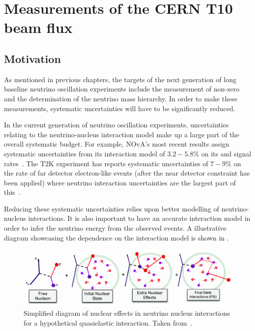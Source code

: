 \chapter{Measurements of the CERN T10 beam flux}
\label{sec:hptpc_beam_flux}

\section{Motivation}
\label{sec:hptpc_beam_flux:motivation}

As mentioned in previous chapters, the targets of the next generation of long baseline neutrino oscillation experiments include the measurement of non-zero \dcp and the determination of the neutrino mass hierarchy.
In order to make these measurements, systematic uncertainties will have to be significantly reduced.

In the current generation of neutrino oscillation experiments, uncertainties relating to the neutrino-nucleus interaction model make up a large part of the overall systematic budget.
For example, NOvA's most recent results assign systematic uncertainties from its interaction model of $3.2-5.8\%$ on its \nue and \anue signal rates~\cite{novaRecent}.
The T2K experiment has reports systematic uncertainties of $7-9\%$ on the rate of far detector electron-like events (after the near detector constraint has been applied) where neutrino interaction uncertainties are the largest part of this~\cite{t2kRecent}.

Reducing these systematic uncertainties relies upon better modelling of neutrino-nucleus interactions.
It is also important to have an accurate interaction model in order to infer the neutrino energy from the observed events.
A illustrative diagram showcasing the dependence on the interaction model is shown in .

\begin{figure}[h]
  \centering
  \includegraphics[width=\linewidth]{files/figures/hptpc_beam_flux/fsiDiag}
  \caption[Simplified diagram of nuclear effects in neutrino nucleus interactions]{Simplified diagram of nuclear effects in neutrino nucleus interactions for a hypothetical quasielastic \numu interaction. Taken from~\cite{nuisanceTalk}.}
  \label{fig:fsiDiag}
\end{figure}

